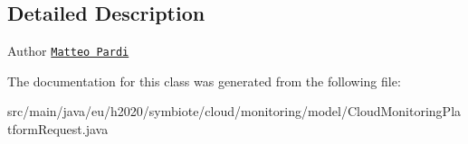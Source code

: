 \subsection{Detailed Description}
\begin{DoxyAuthor}{Author}
\href{mailto:m.pardi@nextworks.it}{\tt Matteo Pardi} 
\end{DoxyAuthor}


The documentation for this class was generated from the following file\+:\begin{DoxyCompactItemize}
\item 
src/main/java/eu/h2020/symbiote/cloud/monitoring/model/Cloud\+Monitoring\+Platform\+Request.\+java\end{DoxyCompactItemize}
